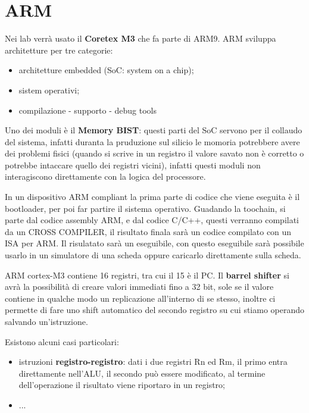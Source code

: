 \documentclass[12pt]{article}
\begin{document}
\newpage
\section{ARM}
Nei lab verr\`a usato il \textbf{Coretex M3} che fa parte di ARM9. ARM sviluppa architetture per tre categorie:
\begin{itemize}
    \item architetture embedded (SoC: system on a chip);
    \item sistem operativi;
    \item compilazione - supporto - debug tools
\end{itemize}


Uno dei moduli \`e il \textbf{Memory BIST}: questi parti del SoC servono per il collaudo del sistema, infatti duranta la pruduzione sul silicio le momoria potrebbere avere dei problemi fisici (quando si scrive in un registro il valore savato non \`e corretto o potrebbe intaccare quello dei registri vicini), infatti questi moduli non interagiscono direttamente con la logica del processore.

In un dispositivo ARM compliant la prima parte di codice che viene eseguita \`e il bootloader, per poi far partire il sistema operativo. Guadando la toochain, si parte dal codice assembly ARM, e dal codice C/C++, questi verranno compilati da un CROSS COMPILER, il risultato finala sar\`a un codice compilato con un ISA per ARM. Il risulatato sar\`a un eseguibile, con questo eseguibile sar\`a possibile usarlo in un simulatore di una scheda oppure caricarlo direttamente sulla scheda.


ARM cortex-M3 contiene 16 registri, tra cui il 15 \`e il PC. Il \textbf{barrel shifter} si avr\`a la possibilit\`a di creare valori immediati fino a 32 bit, sole se il valore contiene in qualche modo un replicazione all'interno di se stesso, inoltre ci permette di fare uno shift automatico del secondo registro su cui stiamo operando salvando un'istruzione.

Esistono alcuni casi particolari:
\begin{itemize}
    \item istruzioni \textbf{registro-registro}: dati i due registri Rn ed Rm, il primo entra direttamente nell'ALU, il secondo pu\`o essere modificato, al termine dell'operazione il risultato viene riportaro in un registro;
    \item ...
\end{itemize}
\end{document}
